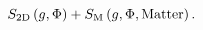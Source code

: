 \begin{equation*}
S_{\mathrm{2D}}\left( g,\Phi \right) +S_{\mathrm{M}}\left( g,\Phi ,\mathrm{%
Matter}\right) .
\end{equation*}

